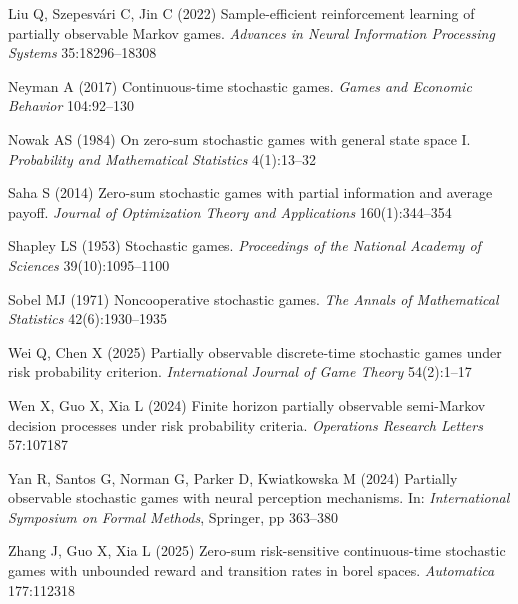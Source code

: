 \documentclass[12pt]{article}
\begin{document}
\begin{thebibliography}{}
Liu Q, Szepesv{\'a}ri C, Jin C (2022) {Sample-efficient reinforcement learning
	of partially observable Markov games}. \textit{Advances in Neural Information
	Processing Systems} 35:18296--18308

Neyman A (2017) Continuous-time stochastic games. \textit{Games and Economic
	Behavior} 104:92--130

Nowak AS (1984) {On zero-sum stochastic games with general state space I}.
\textit{Probability and Mathematical Statistics} 4(1):13--32

Saha S (2014) Zero-sum stochastic games with partial information and average
payoff. \textit{Journal of Optimization Theory and Applications}
160(1):344--354

Shapley LS (1953) Stochastic games. \textit{Proceedings of the National Academy
	of Sciences} 39(10):1095--1100


Sobel MJ (1971) Noncooperative stochastic games. \textit{The Annals of
	Mathematical Statistics} 42(6):1930--1935

Wei Q, Chen X (2025) Partially observable discrete-time stochastic games under
risk probability criterion. \textit{International Journal of Game Theory}
54(2):1--17

Wen X, Guo X, Xia L (2024) {Finite horizon partially observable semi-Markov
	decision processes under risk probability criteria}. \textit{Operations
	Research Letters} 57:107187

Yan R, Santos G, Norman G, Parker D, Kwiatkowska M (2024) Partially observable
stochastic games with neural perception mechanisms. In: \textit{International
	Symposium on Formal Methods}, Springer, pp 363--380

Zhang J, Guo X, Xia L (2025) Zero-sum risk-sensitive continuous-time stochastic
games with unbounded reward and transition rates in borel spaces.
\textit{Automatica} 177:112318

\end{thebibliography}
\end{document}
